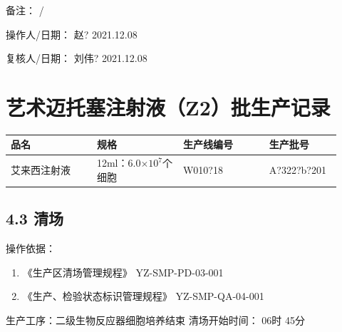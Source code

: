 \documentclass[UTF8,10pt,a4paper,fontset=fandol]{ctexart}
\newcommand{\fieldvalue}[1]{#1}
\newcommand{\handwritten}[1]{#1}
\begin{document}
备注：
\fieldvalue{\handwritten{/}}

操作人/日期：
\fieldvalue{\handwritten{赵?}}\quad
\fieldvalue{\handwritten{2021.12.08}}

复核人/日期：
\fieldvalue{\handwritten{刘伟?}}\quad
\fieldvalue{\handwritten{2021.12.08}}

\newpage

\section*{艺术迈托塞注射液（Z2）批生产记录}

\begin{tabular}{|p{0.24\linewidth}|p{0.24\linewidth}|p{0.24\linewidth}|p{0.20\linewidth}|}
\hline
品名 & 规格 & 生产线编号 & 生产批号 \\
\hline
艾来西注射液 & 12ml：6.0$\times 10^{7}$个细胞 &
\fieldvalue{\handwritten{W010?18}} &
\fieldvalue{\handwritten{A?322?b?201}} \\
\hline
\end{tabular}

\subsection*{4.3 清场}

\noindent
操作依据：

\begin{enumerate}
\item 《生产区清场管理规程》 \hfill YZ-SMP-PD-03-001
\item 《生产、检验状态标识管理规程》 \hfill YZ-SMP-QA-04-001
\end{enumerate}

\noindent
生产工序：二级生物反应器细胞培养结束 \hfill 清场开始时间：
\fieldvalue{\handwritten{06}}时
\fieldvalue{\handwritten{45}}分
\end{document}
